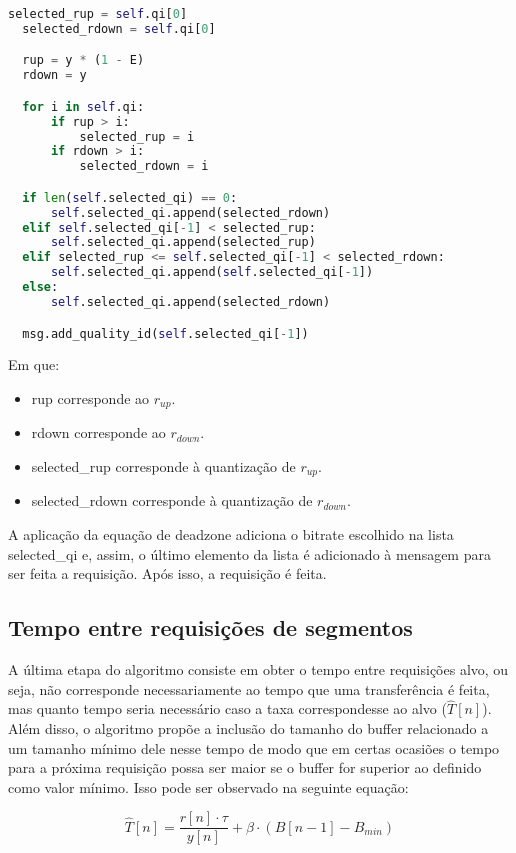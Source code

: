 \documentclass[10pt,twocolumn,letterpaper]{article}
\begin{document}
\begin{lstlisting}[language=python]
  selected_rup = self.qi[0]
  selected_rdown = self.qi[0]

  rup = y * (1 - E)
  rdown = y

  for i in self.qi:
      if rup > i:
          selected_rup = i
      if rdown > i:
          selected_rdown = i

  if len(self.selected_qi) == 0:
      self.selected_qi.append(selected_rdown)
  elif self.selected_qi[-1] < selected_rup:
      self.selected_qi.append(selected_rup)
  elif selected_rup <= self.selected_qi[-1] < selected_rdown:
      self.selected_qi.append(self.selected_qi[-1])
  else:
      self.selected_qi.append(selected_rdown)

  msg.add_quality_id(self.selected_qi[-1])
\end{lstlisting}

Em que:
\begin{itemize}
  \item rup corresponde ao $r_{up}$.
  \item rdown corresponde ao $r_{down}$.
  \item selected\_rup corresponde à quantização de $r_{up}$.
  \item selected\_rdown corresponde à quantização de $r_{down}$.
\end{itemize}

A aplicação da equação de deadzone adiciona o bitrate escolhido na lista selected\_qi e, assim, o último elemento da lista é adicionado à mensagem para ser feita a requisição. Após isso, a requisição é feita.

\subsection{Tempo entre requisições de segmentos}
A última etapa do algoritmo consiste em obter o tempo entre requisições alvo, ou seja, não corresponde necessariamente ao tempo que uma transferência é feita, mas quanto tempo seria necessário caso a taxa correspondesse ao alvo ($\hat{T}[n]$). Além disso, o algoritmo propõe a inclusão do tamanho do buffer relacionado a um tamanho mínimo dele nesse tempo de modo que em certas ocasiões o tempo para a próxima requisição possa ser maior se o buffer for superior ao definido como valor mínimo. Isso pode ser observado na seguinte equação:

\begin{equation}
  \hat{T}[n] = \frac{r[n] \cdot \tau}{y[n]} + \beta \cdot (B[n-1] - B_{min})
\end{equation}
\end{document}
